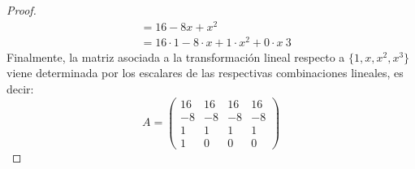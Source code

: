 \documentclass[11pt]{article}
\theoremstyle{definition} %
\begin{document}
\begin{enumerate}
\begin{proof}
\begin{align*}
        & = 16-8 x+x^2 \\
        & = 16 \cdot 1 -8 \cdot x + 1\cdot x^2 + 0\cdot x~3
      \end{align*} 
      Finalmente, la matriz asociada a la transformación lineal respecto a $\{1,x,x^2,x^3\}$ viene determinada por los escalares de las respectivas combinaciones lineales, es decir:
      \[
      A = \begin{pmatrix}
        16 & 16 & 16 & 16 \\
        -8 & -8 & -8 & -8 \\
        1 & 1 & 1 & 1 \\
        1 & 0 & 0 & 0
      \end{pmatrix}
      \]
    \end{proof}
\end{enumerate}
\end{document}
